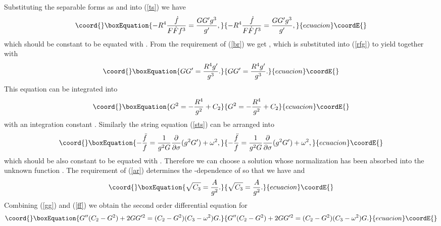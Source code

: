 \documentclass[12pt,a4paper]{article}
\providecommand{\pa}{\partial}
\begin{document}
Substituting the separable forms as \coordHE{} and \coordHE{} into (\ref{ts}) we have
\begin{equation}\coord{}\boxEquation{
- R^4 \frac{\dot{f}}{F\dot{F}f^3} = \frac{GG'g^3}{g'},
\label{rfg}}{
- R^4 \frac{\dot{f}}{F\dot{F}f^3} = \frac{GG'g^3}{g'},
}{ecuacion}\coordE{}\end{equation}
which should be constant to be equated with \coordHE{}. From the requirement of
(\ref{br}) we get \coordHE{}, which is substituted into (\ref{rfg}) 
to yield \coordHE{} together with
\begin{equation}\coord{}\boxEquation{
GG' = \frac{R^4g'}{g^3}.
}{
GG' = \frac{R^4g'}{g^3}.
}{ecuacion}\coordE{}\end{equation}
This equation can be integrated into
\begin{equation}\coord{}\boxEquation{
G^2 = - \frac{R^4}{g^2} + C_2
\label{gg}}{
G^2 = - \frac{R^4}{g^2} + C_2
}{ecuacion}\coordE{}\end{equation}
with an integration constant \coordHE{}. Similarly the string equation 
(\ref{sts}) can be arranged into
\begin{equation}\coord{}\boxEquation{
- \frac{\ddot{f}}{f} = \frac{1}{g^2G} \frac{\pa}{\pa\sigma}(g^2G') 
+ \omega^2,
\label{ff}}{
- \frac{\ddot{f}}{f} = \frac{1}{g^2G} \frac{\pa}{\pa\sigma}(g^2G') 
+ \omega^2,
}{ecuacion}\coordE{}\end{equation}
which should be also constant to be equated with \coordHE{}. Therefore we can
choose a solution \coordHE{} whose normalization has been
absorbed into the unknown function \coordHE{}. The requirement of 
(\ref{ar}) determines the \myHighlight{$\tau$}\coordHE{}-dependence of \coordHE{} so that we have
\coordHE{} and 
\begin{equation}\coord{}\boxEquation{
\sqrt{C_3} = \frac{A}{g^2}.
\label{ca}}{
\sqrt{C_3} = \frac{A}{g^2}.
}{ecuacion}\coordE{}\end{equation}
Combining (\ref{gg}) and (\ref{ff}) we obtain the second order 
differential equation for \coordHE{}
\begin{equation}\coord{}\boxEquation{
G''( C_2 - G^2 ) + 2GG'^2 = ( C_2 - G^2 )( C_3 - \omega^2 )G.
\label{seo}}{
G''( C_2 - G^2 ) + 2GG'^2 = ( C_2 - G^2 )( C_3 - \omega^2 )G.
}{ecuacion}\coordE{}\end{equation}
\end{document}
